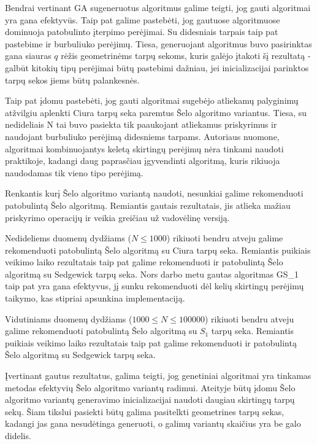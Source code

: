 \documentclass{VUMIFInfKursinis}
\begin{document}
Bendrai vertinant GA sugeneruotus algoritmus galime teigti, jog gauti algoritmai yra gana efektyvūs.
Taip pat galime pastebėti, jog gautuose algoritmuose dominuoja patobulinto įterpimo perėjimai.
Su didesniais tarpais taip pat pastebime ir burbuliuko perėjimų.
Tiesa, generuojant algoritmus buvo pasirinktas gana siauras $q$ rėžis geometrinėms tarpų sekoms, kuris galėjo įtakoti šį rezultatą -
galbūt kitokių tipų perėjimai būtų pastebimi dažniau, jei inicializacijai parinktos tarpų sekos jiems būtų palankesnės.

Taip pat įdomu pastebėti, jog gauti algoritmai sugebėjo atliekamų palyginimų atžvilgiu aplenkti Ciura tarpų seka paremtus Šelo algoritmo variantus.
Tiesa, su nedideliais N tai buvo pasiekta tik paaukojant atliekamus priskyrimus ir naudojant burbuliuko perėjimą didesniems tarpams.
Autoriaus nuomone, algoritmai kombinuojantys keletą skirtingų perėjimų nėra tinkami naudoti praktikoje,
kadangi daug paprasčiau įgyvendinti algoritmą, kuris rikiuoja naudodamas tik vieno tipo perėjimą.


Renkantis kurį Šelo algoritmo variantą naudoti, nesunkiai galime rekomenduoti patobulintą Šelo algoritmą.
Remiantis gautais rezultatais, jis atlieka mažiau priskyrimo operacijų ir veikia greičiau už vadovėlinę versiją.


Nedideliems duomenų dydžiams ($N \leq 1000$) rikiuoti bendru atveju galime rekomenduoti patobulintą Šelo algoritmą su Ciura tarpų seka.
Remiantis puikiais veikimo laiko rezultatais taip pat galime rekomenduoti ir patobulintą Šelo algoritmą su Sedgewick tarpų seka.
Nors darbo metu gautas algoritmas GS\_1 taip pat yra gana efektyvus, jį sunku rekomenduoti dėl
kelių skirtingų perėjimų taikymo, kas stipriai apsunkina implementaciją.

Vidutiniams duomenų dydžiams ($1000 \leq N \leq 100000$) rikiuoti bendru atveju galime rekomenduoti patobulintą Šelo algoritmą su $S_1$ tarpų seka.
Remiantis puikiais veikimo laiko rezultatais taip pat galime rekomenduoti ir patobulintą Šelo algoritmą su Sedgewick tarpų seka.

Įvertinant gautus rezultatus, galima teigti, jog genetiniai algoritmai yra tinkamas metodas efektyvių Šelo algoritmo variantų radimui.
Ateityje būtų įdomu Šelo algoritmo variantų generavimo inicializacijai naudoti daugiau skirtingų tarpų sekų.
Šiam tikslui pasiekti būtų galima pasitelkti geometrines tarpų sekas, kadangi jas gana nesudėtinga generuoti, o galimų variantų skaičius yra be galo didelis.
\end{document}
